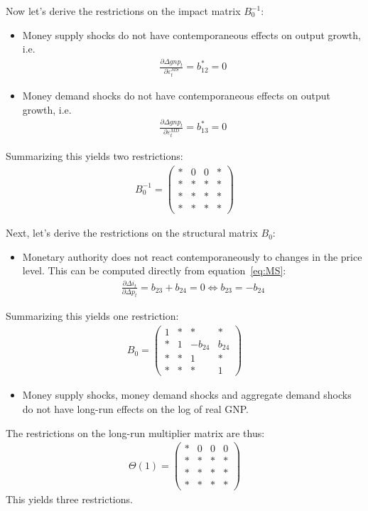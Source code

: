 \begin{enumerate}
Now let's derive the restrictions on the impact matrix \(B_0^{-1}\):
\begin{itemize}
\item Money supply shocks do not have contemporaneous effects on output growth, i.e.\
\begin{align*}
\frac{\partial \Delta gnp_t}{\partial \varepsilon_t^{MS}}= b^*_{12} = 0
\end{align*}

\item Money demand shocks do not have contemporaneous effects on output growth, i.e.\
\begin{align*}
\frac{\partial \Delta gnp_t}{\partial \varepsilon_t^{MD}}= b^*_{13} = 0	
\end{align*}
\end{itemize}
Summarizing this yields two restrictions:
\begin{align*}
B_0^{-1} =
\begin{pmatrix}
* & 0 & 0 & *\\
* & * & * & *\\
* & * & * & *\\
* & * & * & *
\end{pmatrix}
\end{align*}

Next, let's derive the restrictions on the structural matrix \(B_0\):
\begin{itemize}
\item Monetary authority does not react contemporaneously to changes in the price level.
This can be computed directly from equation~\eqref{eq:MS}:
\begin{align*}
\frac{\partial \Delta i_t}{\partial \Delta p_t}= b_{23} + b_{24} = 0 \Leftrightarrow b_{23} = -b_{24}
\end{align*}
\end{itemize}
Summarizing this yields one restriction:
\begin{align*}
B_0 =
\begin{pmatrix}
1 & * & * & *\\
* & 1 & -b_{24} & b_{24}\\
* & * & 1 & *\\
* & * & * & 1
\end{pmatrix}
\end{align*}

\begin{itemize}
\item Money supply shocks, money demand shocks and aggregate demand shocks do not have long-run effects on the log of real GNP.
\end{itemize}
The restrictions on the long-run multiplier matrix are thus:
\begin{align*}
\Theta(1) =
\begin{pmatrix}
* & 0 & 0 & 0\\
* & * & * & *\\
* & * & * & *\\
* & * & * & *
\end{pmatrix}
\end{align*}
This yields three restrictions.


\end{enumerate}
